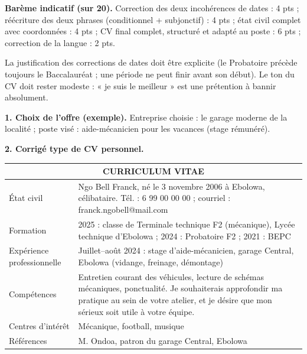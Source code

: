 \documentclass[11pt]{article}
\begin{document}
\begin{corrige}
\textbf{Barème indicatif (sur 20).} Correction des deux incohérences de dates : 4 pts ; réécriture des deux phrases (conditionnel + subjonctif) : 4 pts ; état civil complet avec coordonnées : 4 pts ; CV final complet, structuré et adapté au poste : 6 pts ; correction de la langue : 2 pts.
\end{corrige}

\begin{attention}
La justification des corrections de dates doit être explicite (le Probatoire précède toujours le Baccalauréat ; une période ne peut finir avant son début). Le ton du CV doit rester modeste : « je suis le meilleur » est une prétention à bannir absolument.
\end{attention}

\begin{corrige}
\textbf{1. Choix de l'offre (exemple).} Entreprise choisie : le garage moderne de la localité ; poste visé : aide-mécanicien pour les vacances (stage rémunéré).

\textbf{2. Corrigé type de CV personnel.}

\begin{center}
\begin{tabularx}{\linewidth}{|l|X|}
\hline
\multicolumn{2}{|c|}{\textbf{CURRICULUM VITAE}} \\
\hline
État civil & Ngo Bell Franck, né le 3 novembre 2006 à Ebolowa, célibataire. Tél. : 6 99 00 00 00 ; courriel : franck.ngobell@mail.com \\
\hline
Formation & 2025 : classe de Terminale technique F2 (mécanique), Lycée technique d'Ebolowa ; 2024 : Probatoire F2 ; 2021 : BEPC \\
\hline
Expérience professionnelle & Juillet–août 2024 : stage d'aide-mécanicien, garage Central, Ebolowa (vidange, freinage, démontage) \\
\hline
Compétences & Entretien courant des véhicules, lecture de schémas mécaniques, ponctualité. Je souhaiterais approfondir ma pratique au sein de votre atelier, et je désire que mon sérieux soit utile à votre équipe. \\
\hline
Centres d'intérêt & Mécanique, football, musique \\
\hline
Références & M. Ondoa, patron du garage Central, Ebolowa \\
\hline
\end{tabularx}
\end{center}


\end{corrige}
\end{document}
